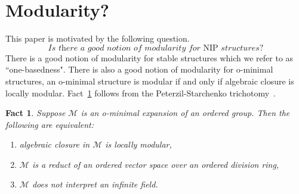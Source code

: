 \documentclass[bibalpha]{amsart}
\newtheorem{fact}[theorem]{Fact}
\theoremstyle{definition}
\theoremstyle{remark}
\newcommand{\Sh}[1]{\ensuremath{\mathscr{#1}^{\mathrm{Sh}}}}
\newcommand{\nip}{\mathrm{NIP}}
\newcommand{\Sa}[1]{\ensuremath{\mathscr{#1}}}
\newcommand{\B}{\mathbb{B}}
\newcommand{\Z}{\mathbb{Z}}
\newcommand{\Q}{\mathbb{Q}}
\newcommand{\R}{\mathbb{R}}
\begin{document}
\begin{comment}
\noindent
The most modest way to enlarge the class of o-minimal expansions of ordered groups is to pass to non-valuational weakly o-minimal structures, see \cite{Wencel-1,Wencel-2,BHP-pairs}.
But we run into complications in this setting.
In \cite{big-nip} we describe a non-valuational weakly o-minimal expansion $\Sa M$ of a divisible ordered abelian group $(M,+,<)$ such that $\Sa M$ does not interpret an infinite field, algebraic closure in $\Sa M$ agrees with algebraic closure in $(M,+,<)$, and $\Sh M$ interprets $(\R,+,\times)$.
\newline

\noindent
Another setting in we strongly expect there to be a Zil'ber dichotomy is over $\Q_p$.
Specifically, we expect there to be a dichotomy between modularity and field structure for $\Q_p$-definable set of imaginaries.
Of course $\Q_p$ has field structure and the valued group $(\Z,+,<)$ should be modular.
But $\B(\Q_p)$ should be non-modular and does not define a field.
\newline
\end{comment}

\section{Modularity?}
\noindent
This paper is motivated by the following question.
$$ \textit{Is there a good notion of modularity for $\nip$ structures?} $$
There is a good notion of modularity for stable structures which we refer to as ``one-basedness".
There is also a good notion of modularity for o-minimal structures, an o-minimal structure is modular if and only if algebraic closure is locally modular.
Fact~\ref{fact:ps} follows from the Peterzil-Starchenko trichotomy~\cite{PS-Tri}.

\begin{fact}
\label{fact:ps}
Suppose $\Sa M$ is an o-minimal expansion of an ordered group.
Then the following are equivalent:
\begin{enumerate}
\item algebraic closure in $\Sa M$ is locally modular,
\item $\Sa M$ is a reduct of an ordered vector space over an ordered division ring,
\item $\Sa M$ does not interpret an infinite field.
\end{enumerate}
\end{fact}
\end{document}
